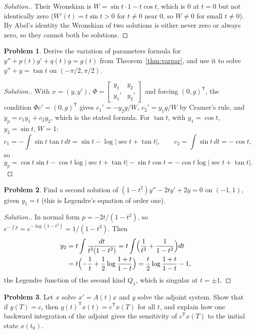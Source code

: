 \documentclass[11pt,a4paper]{article}
\numberwithin{equation}{section}
\theoremstyle{definition}
\newtheorem{problemx}{Problem}[subsection]
\newenvironment{problem}{\begin{problemx}}{\end{problemx}}
\newenvironment{solution}
  {\renewcommand{\qedsymbol}{}\begin{proof}[\textit{Solution}.]}
  {\end{proof}}
\begin{document}
\begin{solution}
Their Wronskian is $W = \sin t \cdot 1 - t\cos t$, which is $0$ at $t = 0$ but not identically zero ($W'(t) = t\sin t > 0$ for $t \neq 0$ near $0$, so $W \neq 0$ for small $t \neq 0$). By Abel's identity the
Wronskian of two solutions is either never zero or always zero, so they cannot both be solutions.
\end{solution}

\begin{problem}
\label{prob:vp2}
Derive the variation of parameters formula for $y'' + p(t)y' + q(t)y = g(t)$ from Theorem~\ref{thm:varpar}, and use it to solve $y'' + y = \tan t$ on $(-\pi/2, \pi/2)$.
\end{problem}

\begin{solution}
With $x = (y, y')$, $\Phi = \begin{bmatrix} y_1 & y_2\\ y_1' & y_2'\end{bmatrix}$ and forcing $(0, g)^{\mathsf T}$, the condition $\Phi c' = (0, g)^{\mathsf T}$ gives $c_1' = -y_2g/W$, $c_2' = y_1g/W$ by Cramer's rule, and $y_p = c_1y_1 + c_2y_2$,
which is the stated formula. For $\tan t$, with $y_1 = \cos t$, $y_2 = \sin t$, $W = 1$:
\[
c_1 = -\int\sin t\tan t\,dt = \sin t - \log|\sec t + \tan t|, \qquad c_2 = \int\sin t\,dt = -\cos t ,
\]
so
\[
y_p = \cos t\sin t - \cos t\log|\sec t + \tan t| - \sin t\cos t = -\cos t\log|\sec t + \tan t| .
\]
\end{solution}

\begin{problem}
Find a second solution of $(1 - t^2)y'' - 2ty' + 2y = 0$ on $(-1, 1)$, given $y_1 = t$ (this is Legendre's equation of order one).
\end{problem}

\begin{solution}
In normal form $p = -2t/(1 - t^2)$, so $e^{-\int p} = e^{-\log(1 - t^2)} = 1/(1 - t^2)$. Then
\begin{align*}
y_2 &= t\int\frac{dt}{t^2(1 - t^2)} = t\int\Bigl(\frac{1}{t^2} + \frac{1}{1 - t^2}\Bigr)dt\\
&= t\Bigl(-\frac1t + \frac12\log\frac{1 + t}{1 - t}\Bigr) = \frac t2\log\frac{1 + t}{1 - t} - 1 ,
\end{align*}
the Legendre function of the second kind $Q_1$, which is singular at $t = \pm1$.
\end{solution}

\begin{problem}
Let $x$ solve $x' = A(t)x$ and $y$ solve the adjoint system. Show that if $y(T) = c$, then $y(t)^{\mathsf T}x(t) = c^{\mathsf T}x(T)$ for all $t$, and explain how one backward integration of the adjoint
gives the sensitivity of $c^{\mathsf T}x(T)$ to the initial state $x(t_0)$.
\end{problem}
\end{document}
